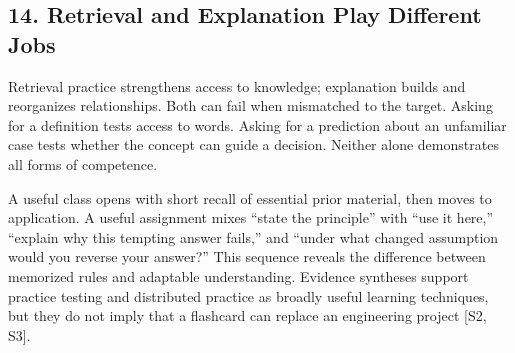 \subsection*{14. Retrieval and Explanation Play Different Jobs}

Retrieval practice strengthens access to knowledge; explanation builds and reorganizes relationships. Both can fail when mismatched to the target. Asking for a definition tests access to words. Asking for a prediction about an unfamiliar case tests whether the concept can guide a decision. Neither alone demonstrates all forms of competence.

A useful class opens with short recall of essential prior material, then moves to application. A useful assignment mixes ``state the principle'' with ``use it here,'' ``explain why this tempting answer fails,'' and ``under what changed assumption would you reverse your answer?'' This sequence reveals the difference between memorized rules and adaptable understanding. Evidence syntheses support practice testing and distributed practice as broadly useful learning techniques, but they do not imply that a flashcard can replace an engineering project [S2, S3].
